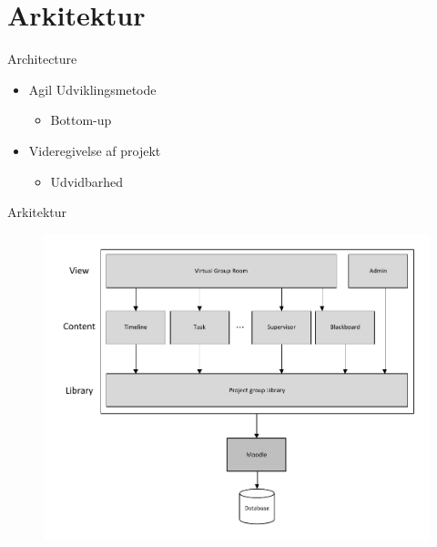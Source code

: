 \section{Arkitektur}
\begin{frame}{Architecture}
\begin{itemize}
	\item Agil Udviklingsmetode
	\begin{itemize}
		\item Bottom-up  
	\end{itemize}
	\item Videregivelse af projekt
	\begin{itemize}
		\item Udvidbarhed
	\end{itemize}
	
\end{itemize}
\end{frame}


\begin{frame}{Arkitektur}
\begin{figure}%
\includegraphics[width=\columnwidth]{input/assets/architecture}%
\end{figure}	
\end{frame}